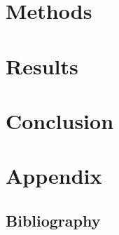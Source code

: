\documentclass[11pt, titlepage, a4paper, twoside, onecolumn, DIV=calc]{scrbook} %
\begin{document}
\part{Methods}




\part{Results}
\renewcommand{\cftdot}{}


\pagestyle{raphimen}





\part{Conclusion}
 

\part{Appendix}
\setcounter{chapter}{11}





\pagestyle{raphimen}



\chapter*{Bibliography}





\begingroup
  \def\chapter*#1{}
\begin{scriptsize}  
\begin{multicols}{2}
\justify
 
\end{multicols}                            
\end{scriptsize}
\endgroup
\end{document}
